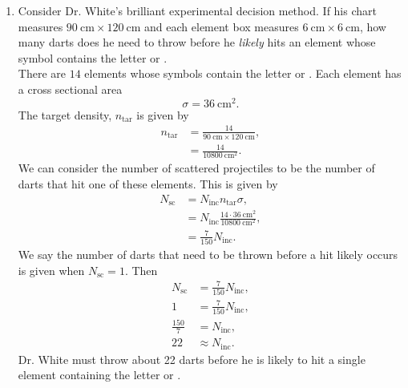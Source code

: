 \documentclass[a4paper, 12pt]{config/homework}
\begin{document}
\begin{enumerate}
\pagebreak
\item Consider Dr. White's brilliant experimental decision method. If his chart measures \(\qty{90}{\centi\meter}\times\qty{120}{\centi\meter}\) and each element box measures \(\qty{6}{\centi\meter}\times\qty{6}{\centi\meter}\), how many darts does he need to throw before he \textit{likely} hits an element whose symbol contains the letter  or .
\\ There are \(14\) elements whose symbols contain the letter  or . Each element has a cross sectional area
\[\sigma = \qty{36}{\centi\meter\squared}.\]
The target density, \(n_{\text{tar}}\) is given by
\begin{align*}
n_{\text{tar}} &= \frac{14}{\qty{90}{\centi\meter}\times\qty{120}{\centi\meter}},\\
&= \frac{14}{\qty{10800}{\centi\meter\squared}}.
\end{align*}
We can consider the number of scattered projectiles to be the number of darts that hit one of these elements. This is given by
\begin{align*}
N_{\text{sc}} &= N_{\text{inc}}n_{\text{tar}}\sigma,\\
&= N_{\text{inc}}\frac{14\cdot\qty{36}{\centi\meter\squared}}{\qty{10800}{\centi\meter\squared}},\\
&= \frac{7}{150}N_{\text{inc}}.
\end{align*}
We say the number of darts that need to be thrown before a hit likely occurs is given when \(N_{\text{sc}}=1. \)
Then
\begin{align*}
N_{\text{sc}} &= \frac{7}{150}N_{\text{inc}},\\
1 &= \frac{7}{150}N_{\text{inc}},\\
\frac{150}{7} &= N_{\text{inc}},\\
22 &\approx N_{\text{inc}}.
\end{align*}
Dr. White must throw about 22 darts before he is likely to hit a single element containing the letter  or .


\end{enumerate}
\end{document}
